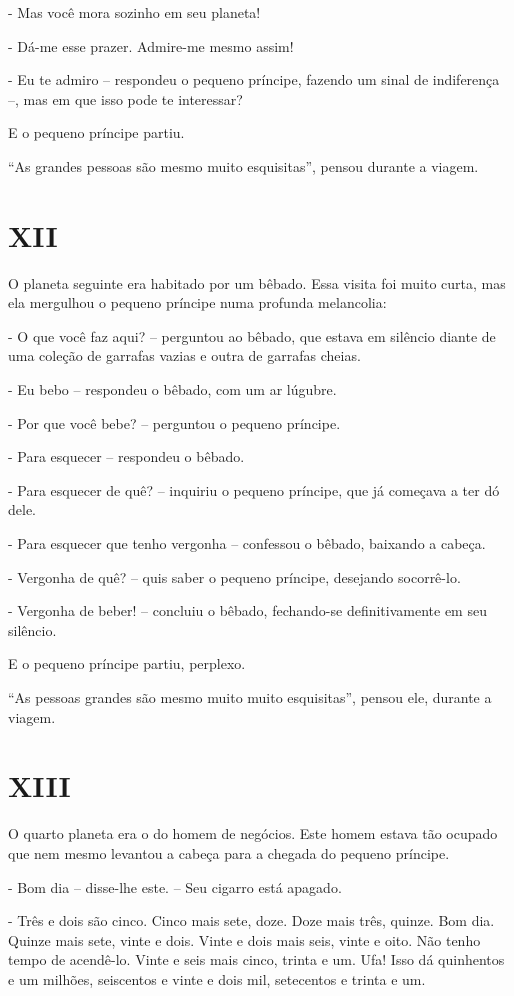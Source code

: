 - Mas você mora sozinho em seu planeta!

- Dá-me esse prazer. Admire-me mesmo assim!

- Eu te admiro -- respondeu o pequeno príncipe, fazendo um sinal de
indiferença --, mas em que isso pode te interessar?

E o pequeno príncipe partiu.

``As grandes pessoas são mesmo muito esquisitas'', pensou durante a
viagem.

\chapter{XII}

O planeta seguinte era habitado por um bêbado. Essa visita foi muito
curta, mas ela mergulhou o pequeno príncipe numa profunda melancolia:

- O que você faz aqui? -- perguntou ao bêbado, que estava em silêncio
diante de uma coleção de garrafas vazias e outra de garrafas cheias.

- Eu bebo -- respondeu o bêbado, com um ar lúgubre.

- Por que você bebe? -- perguntou o pequeno príncipe.

- Para esquecer -- respondeu o bêbado.

- Para esquecer de quê? -- inquiriu o pequeno príncipe, que já começava
a ter dó dele.

- Para esquecer que tenho vergonha -- confessou o bêbado, baixando a
cabeça.

- Vergonha de quê? -- quis saber o pequeno príncipe, desejando
socorrê-lo.

- Vergonha de beber! -- concluiu o bêbado, fechando-se definitivamente
em seu silêncio.

E o pequeno príncipe partiu, perplexo.

``As pessoas grandes são mesmo muito muito esquisitas'', pensou ele,
durante a viagem.

\chapter{XIII}

O quarto planeta era o do homem de negócios. Este homem estava tão
ocupado que nem mesmo levantou a cabeça para a chegada do pequeno
príncipe.

- Bom dia -- disse-lhe este. -- Seu cigarro está apagado.

- Três e dois são cinco. Cinco mais sete, doze. Doze mais três, quinze.
Bom dia. Quinze mais sete, vinte e dois. Vinte e dois mais seis, vinte e
oito. Não tenho tempo de acendê-lo. Vinte e seis mais cinco, trinta e
um. Ufa! Isso dá quinhentos e um milhões, seiscentos e vinte e dois mil,
setecentos e trinta e um.

